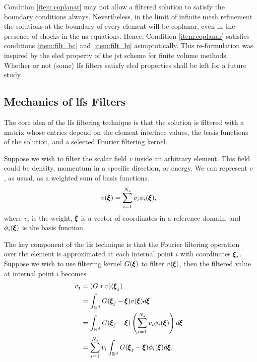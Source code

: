 Condition \ref{item:coplanar} may not allow a filtered solution to satisfy the boundary conditions always. Nevertheless, in the limit of infinite mesh refinement the solutions at the boundary of every element will be coplanar, even in the presence of shocks in the \gls{ns}  equations. Hence, Condition \ref{item:coplanar} satisfies conditions \ref{item:filt_bc} and \ref{item:filt_bi} asimptotically. This re-formulation was inspired by the \gls{eled}  property of the \gls{jst}  scheme\cite{jameson1981numerical} for finite volume methods. Whether or not (some) \gls{lfs} filters satisfy \gls{eled}  properties shall be left for a future study.


\subsection{Mechanics of \gls{lfs} Filters}

The core idea of the \gls{lfs} filtering technique is that the solution is filtered with a matrix whose entries depend on the element interface values, the basis functions of the solution, and a selected Fourier filtering kernel.

Suppose we wish to filter the scalar field $v$ inside an arbitrary element. This field could be density, momentum in a specific direction, or energy. We can represent $v$, as usual, as a weighted sum of basis functions.
\begin{equation}
\label{eqn:polyexp}
v({\pmb \xi}) = \sum^{N_s}_{i=1} v_i \phi_i({\pmb \xi}),
\end{equation}
where $v_i$ is the \ith weight, ${\pmb \xi}$ is a vector of coordinates in a reference domain, and $\phi_i({\pmb \xi})$ is the \ith basis function.

The key component of the \gls{lfs} technique is that the Fourier filtering operation over the element is approximated at each internal point $i$ with coordinates ${\pmb \xi}_i$. Suppose we wish to use filtering kernel $G({\pmb \xi})$ to filter $v({\pmb \xi})$, then the filtered value at internal point $i$ becomes
\begin{equation}
\label{eqn:convolution}
\begin{split}
\bar{v}_j &= (G \ast v)({\pmb \xi}_j)\\
&= \int_{\mathbb{R}^d} G({\pmb \xi}_j - {\pmb \xi})v({\pmb \xi})d{\pmb \xi}\\
&= \int_{\mathbb{R}^d} G({\pmb \xi}_j - {\pmb \xi})\left(\sum^{N_s}_{i=1} v_i \phi_i({\pmb \xi})\right)d{\pmb \xi}\\
&= \sum^{N_s}_{i=1}v_i\int_{\mathbb{R}^d} G({\pmb \xi}_j - {\pmb \xi})  \phi_i({\pmb \xi})d{\pmb \xi},\\
\end{split}
\end{equation}

